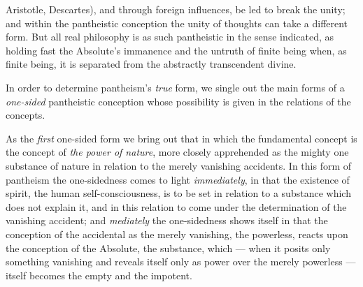 \documentclass[12pt,a4paper]{book}
\begin{document}
Aristotle, Descartes), and through foreign influences, be led to break the
unity; and within the pantheistic conception the unity of thoughts can take a
different form. But all real philosophy is as such pantheistic in the sense
indicated, as holding fast the Absolute's immanence and the untruth of finite
being when, as finite being, it is separated from the abstractly transcendent
divine.

In order to determine pantheism's \emph{true} form, we single out the main
forms of a \emph{one-sided} pantheistic conception whose possibility is given
in the relations of the concepts.

As the \emph{first} one-sided form we bring out that in which the fundamental
concept is the concept of \emph{the power of nature}, more closely apprehended
as the mighty one substance of nature in relation to the merely vanishing
accidents. In this form of pantheism the one-sidedness comes to light
\emph{immediately}, in that the existence of spirit, the human
self-consciousness, is to be set in relation to a substance which does not
explain it, and in this relation to come under the determination of the
vanishing accident; and \emph{mediately} the one-sidedness shows itself in
that the conception of the accidental as the merely vanishing, the powerless,
reacts upon the conception of the Absolute, the substance, which --- when it
posits only something vanishing and reveals itself only as power over the
merely powerless --- itself becomes the empty and the impotent.
\end{document}

